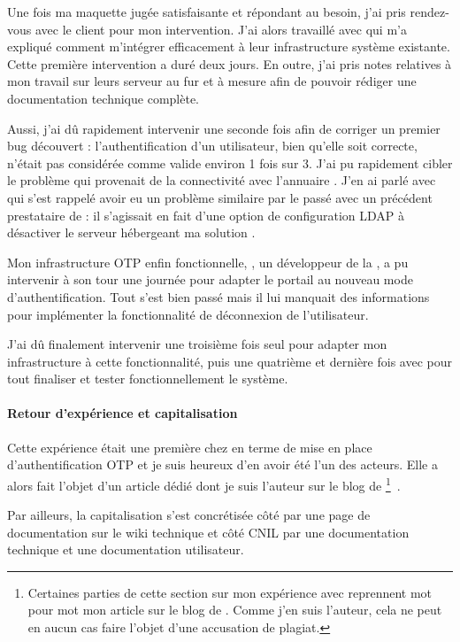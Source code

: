 Une fois ma maquette jugée satisfaisante et répondant au besoin, j'ai pris rendez-vous avec le client pour mon intervention.
J'ai alors travaillé avec \amimiette{} qui m'a expliqué comment m'intégrer efficacement à leur infrastructure système existante.
Cette première intervention a duré deux jours.
En outre, j'ai pris notes relatives à mon travail sur leurs serveur au fur et à mesure afin de pouvoir rédiger une documentation technique complète.

Aussi, j'ai dû rapidement intervenir une seconde fois afin de corriger un premier bug découvert : l'authentification d'un utilisateur, bien qu'elle soit correcte, n'était pas considérée comme valide environ 1 fois sur 3.
J'ai pu rapidement cibler le problème qui provenait de la connectivité avec l'annuaire \aad.
J'en ai parlé avec \amimiette{} qui s'est rappelé avoir eu un problème similaire par le passé avec un précédent prestataire de \asmile : il s'agissait en fait d'une option de configuration LDAP à désactiver le serveur hébergeant ma solution \alinotp. 

Mon infrastructure OTP enfin fonctionnelle, \arolel{}, un développeur de la \abugan{}, a pu intervenir à son tour une journée pour adapter le portail \atypo{} au nouveau mode d'authentification.
Tout s'est bien passé mais il lui manquait des informations pour implémenter la fonctionnalité de déconnexion de l'utilisateur.

J'ai dû finalement intervenir une troisième fois seul pour adapter mon infrastructure à cette fonctionnalité, puis une quatrième et dernière fois avec \arolel{} pour tout finaliser et tester fonctionnellement le système.

\paragraph{Retour d'expérience et capitalisation}
Cette expérience était une première chez \asmile{} en terme de mise en place d'authentification OTP et je suis heureux d'en avoir été l'un des acteurs.
Elle a alors fait l'objet d'un article dédié dont je suis l'auteur sur le blog de \asmile{}\footnote{Certaines parties de cette section sur mon expérience avec \alinotp{} reprennent mot pour mot mon article sur le blog de \asmile{}. Comme j'en suis l'auteur, cela ne peut en aucun cas faire l'objet d'une accusation de plagiat.}~\cite{blog}.

Par ailleurs, la capitalisation s'est concrétisée côté \asmile{} par une page de documentation sur le wiki technique et côté CNIL par une documentation technique et une documentation utilisateur.


